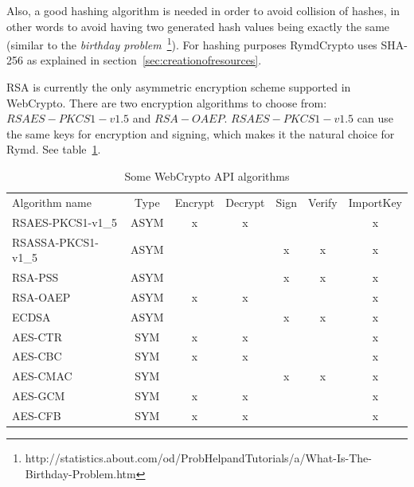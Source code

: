 Also, a good hashing algorithm is needed in order to avoid collision of hashes, in other words to avoid having two generated hash values being exactly the same (similar to the \emph{birthday problem}~\footnote{http://statistics.about.com/od/ProbHelpandTutorials/a/What-Is-The-Birthday-Problem.htm}). For hashing purposes RymdCrypto uses SHA-256 as explained in section~\ref{sec:creationofresources}.

RSA is currently the only asymmetric encryption scheme supported in WebCrypto. There are two encryption algorithms to choose from: $RSAES-PKCS1-v1.5$ and $RSA-OAEP$. $RSAES-PKCS1-v1.5$ can use the same keys for encryption and signing, which makes it the natural choice for Rymd. See table~\ref{table:webcryptoapi}.



\begin{table}[ht]
\centering
\begin{tabular}{lcccccc}
Algorithm name & Type & Encrypt & Decrypt & Sign & Verify & ImportKey \\
RSAES-PKCS1-v1\_5 & ASYM & x & x &  &  & x \\
RSASSA-PKCS1-v1\_5 & ASYM &  &  & x & x & x \\
RSA-PSS & ASYM &  &  & x & x & x \\
RSA-OAEP & ASYM & x & x &  &  & x \\
ECDSA & ASYM &  &  & x & x & x \\
AES-CTR & SYM & x & x &  &  & x \\
AES-CBC & SYM & x & x &  &  & x \\
AES-CMAC & SYM &  &  & x & x & x \\
AES-GCM & SYM & x & x &  &  & x \\
AES-CFB & SYM & x & x &  &  & x
\end{tabular}
\caption{Some WebCrypto API algorithms}
\label{table:webcryptoapi}
\end{table}

